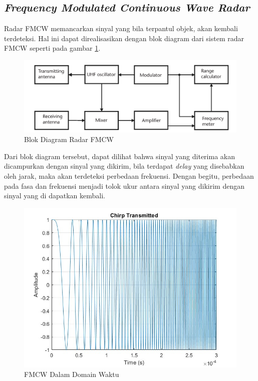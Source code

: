 \subsection{\textit{Frequency Modulated Continuous Wave Radar}}

Radar FMCW memancarkan sinyal yang bila terpantul objek, akan kembali terdeteksi. Hal ini dapat direalisasikan dengan blok diagram dari sistem radar FMCW seperti pada gambar \ref{pic:FMCWBlock}.  

\begin{figure}
	\begin{center}
		\includegraphics[scale=0.3]{pics/bab2/blokDiagramFMCW.png}
		\caption[Blok Diagram Radar FMCW]{Blok Diagram Radar FMCW}
		\label{pic:FMCWBlock}
	\end{center}
\end{figure}

Dari blok diagram tersebut, dapat dilihat bahwa sinyal yang diterima akan dicampurkan dengan sinyal yang dikirim, bila terdapat \textit{delay} yang disebabkan oleh jarak, maka akan terdeteksi perbedaan frekuensi. Dengan begitu, perbedaan pada fasa dan frekuensi menjadi tolok ukur antara sinyal yang dikirim dengan sinyal yang di dapatkan kembali.

\begin{figure}
	\begin{center}
		\includegraphics[scale=0.4]{pics/bab2/ChirpTx.jpg}
		\caption[FMCW Dalam Domain Waktu]{FMCW Dalam Domain Waktu}
		\label{pic:FMCWTime}
	\end{center}
\end{figure}

